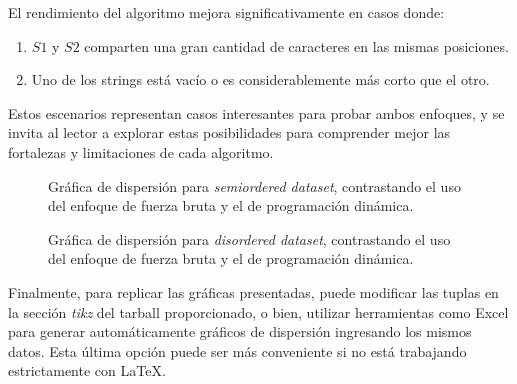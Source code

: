 El rendimiento del algoritmo mejora significativamente en casos donde:
\begin{enumerate}
    \item \( S1 \) y \( S2 \) comparten una gran cantidad de caracteres en las mismas posiciones.
    \item Uno de los strings está vacío o es considerablemente más corto que el otro.
\end{enumerate}

Estos escenarios representan casos interesantes para probar ambos enfoques, y se invita al lector a explorar estas posibilidades para comprender mejor las fortalezas y limitaciones de cada algoritmo.

\begin{figure}[H]
    \centering
    
    \caption{Gráfica de dispersión para \textit{semiordered dataset}, contrastando el uso del enfoque de fuerza bruta y el de programación dinámica.}
    \label{fig:grafico_dispersion_2}
\end{figure}

\begin{figure}[H]
    \centering
    
    \caption{Gráfica de dispersión para \textit{disordered dataset}, contrastando el uso del enfoque de fuerza bruta y el de programación dinámica.}
    \label{fig:grafico_dispersion_3}
\end{figure}

Finalmente, para replicar las gráficas presentadas, puede modificar las tuplas en la sección \textit{tikz} del tarball proporcionado, o bien, utilizar herramientas como Excel para generar automáticamente gráficos de dispersión ingresando los mismos datos. Esta última opción puede ser más conveniente si no está trabajando estrictamente con \LaTeX.

